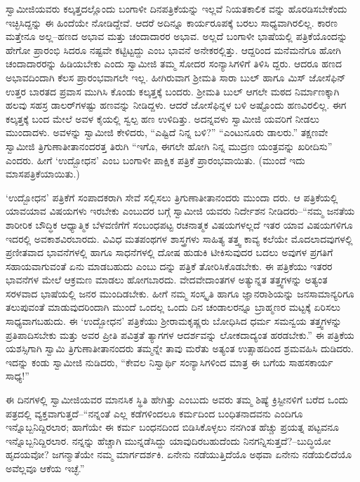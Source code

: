 ಸ್ವಾಮೀಜಿಯವರು ಕಲ್ಕತ್ತದಲ್ಲೊಂದು ಬಂಗಾಳೀ ದಿನಪತ್ರಿಕೆಯನ್ನು ಇಲ್ಲವೆ ನಿಯತಕಾಲಿಕ ವನ್ನು ಹೊರಡಿಸಬೇಕೆಂದು ಇಚ್ಛಿಸಿದ್ದನ್ನು ಈ ಹಿಂದೆಯೇ ನೋಡಿದ್ದೇವೆ. ಆದರೆ ಅದಿನ್ನೂ ಕಾರ್ಯರೂಪಕ್ಕೆ ಬರಲು ಸಾಧ್ಯವಾಗಿರಲಿಲ್ಲ. ಕಾರಣ ಮತ್ತೇನೂ ಅಲ್ಲ–ಹಣದ ಅಭಾವ ಮತ್ತು ಚಂದಾದಾರರ ಅಭಾವ. ಅಲ್ಲದೆ ಬಂಗಾಳೀ ಭಾಷೆಯಲ್ಲಿ ಪತ್ರಿಕೆಯೊಂದನ್ನು ಹೇಗೋ ಪ್ರಾರಂಭಿ ಸಿದರೂ ನಷ್ಟವೇ ಕಟ್ಟಿಟ್ಟದ್ದು ಎಂಬ ಭಾವನೆ ಅನೇಕರಲ್ಲಿತ್ತು. ಆದ್ದರಿಂದ ಮನೆಮನೆಗೂ ಹೋಗಿ ಚಂದಾದಾರರನ್ನು ಹಿಡಿಯಬೇಕು ಎಂದು ಸ್ವಾಮೀಜಿ ತಮ್ಮ ಸೋದರ ಸಂನ್ಯಾಸಿಗಳಿಗೆ ತಿಳಿಸಿ ದ್ದರು. ಆದರೂ ಹಣದ ಅಭಾವದಿಂದಾಗಿ ಕೆಲಸ ಪ್ರಾರಂಭವಾಗಲೇ ಇಲ್ಲ. ಹೀಗಿರುವಾಗ ಶ್ರೀಮತಿ ಸಾರಾ ಬುಲ್ ಹಾಗೂ ಮಿಸ್ ಜೋಸೆಫಿನ್ ಉತ್ತರ ಬಾರತದ ಪ್ರವಾಸ ಮುಗಿಸಿ ಕೊಂಡು ಕಲ್ಕತ್ತಕ್ಕೆ ಬಂದರು. ಶ್ರೀಮತಿ ಬುಲ್ ಆಗಲೇ ಮಠದ ನಿರ್ಮಾಣಕ್ಕಾಗಿ ಹಲವು ಸಹಸ್ರ ಡಾಲರ್​ಗಳಷ್ಟು ಹಣವನ್ನು ನೀಡಿದ್ದಳು. ಆದರೆ ಜೋಸೆಫಿನ್ನಳ ಬಳಿ ಅಷ್ಟೊಂದು ಹಣವಿರಲಿಲ್ಲ. ಈಗ ಕಲ್ಕತ್ತಕ್ಕೆ ಬಂದ ಮೇಲೆ ಅವಳ ಕೈಯಲ್ಲಿ ಸ್ವಲ್ಪ ಹಣ ಉಳಿದಿತ್ತು. ಅದನ್ನವಳು ಸ್ವಾಮೀಜಿ ಯವರಿಗೆ ನೀಡಲು ಮುಂದಾದಳು. ಅವಳನ್ನು ಸ್ವಾಮೀಜಿ ಕೇಳಿದರು, “ಎಷ್ಟಿದೆ ನಿನ್ನ ಬಳಿ?” “ಎಂಟುನೂರು ಡಾಲರು.” ತಕ್ಷಣವೇ ಸ್ವಾಮೀಜಿ ತ್ರಿಗುಣಾತೀತಾನಂದರತ್ತ ತಿರುಗಿ “ಇಗೊ, ಈಗಲೇ ಹೋಗಿ ನಿನ್ನ ಮುದ್ರಣ ಯಂತ್ರವನ್ನು ಖರೀದಿಸು” ಎಂದರು. ಹೀಗೆ ‘ಉದ್ಬೋಧನ’ ಎಂಬ ಬಂಗಾಳೀ ಪಾಕ್ಷಿಕ ಪತ್ರಿಕೆ ಪ್ರಾರಂಭವಾಯಿತು. (ಮುಂದೆ ಇದು ಮಾಸಪತ್ರಿಕೆಯಾಯಿತು.)

‘ಉದ್ಬೋಧನ’ ಪತ್ರಿಕೆಗೆ ಸಂಪಾದಕರಾಗಿ ಸೇವೆ ಸಲ್ಲಿಸಲು ತ್ರಿಗುಣಾತೀತಾನಂದರು ಮುಂದಾ ದರು. ಆ ಪತ್ರಿಕೆಯಲ್ಲಿ ಯಾವಯಾವ ವಿಷಯಗಳು ಇರಬೇಕು ಎಂಬುದರ ಬಗ್ಗೆ ಸ್ವಾಮೀಜಿ ಯವರು ನಿರ್ದೇಶನ ನೀಡಿದರು–“ನಮ್ಮ ಜನತೆಯ ಶಾರೀರಿಕ ಬೌದ್ಧಿಕ ಆಧ್ಯಾತ್ಮಿಕ ಬೆಳವಣಿಗೆಗೆ ಸಂಬಂಧಪಟ್ಟ ರಚನಾತ್ಮಕ ವಿಷಯಗಳಲ್ಲದೆ ಇತರ ಯಾವ ವಿಷಯಗಳಿಗೂ ಇದರಲ್ಲಿ ಅವಕಾಶವಿರಬಾರದು. ವಿವಿಧ ಮತಪಂಥಗಳ ಶಾಸ್ತ್ರಗಳು ಸಾಹಿತ್ಯ ತತ್ತ್ವ ಕಾವ್ಯ ಕಲೆಯೇ ಮೊದಲಾದವುಗಳಲ್ಲಿ ಪ್ರಣೀತವಾದ ಭಾವನೆಗಳಲ್ಲಿ ಹಾಗೂ ಸಾಧನೆಗಳಲ್ಲಿ ದೋಷ ಹುಡುಕಿ ಟೀಕಿಸುವುದರ ಬದಲು ಅವುಗಳ ಪ್ರಗತಿಗೆ ಸಹಾಯವಾಗುವಂತೆ ಏನು ಮಾಡಬಹುದು ಎಂಬು ದನ್ನು ಪತ್ರಿಕೆ ತೋರಿಸಿಕೊಡಬೇಕು. ಈ ಪತ್ರಿಕೆಯು ಇತರರ ಭಾವನೆಗಳ ಮೇಲೆ ಆಕ್ರಮಣ ಮಾಡಲು ಹೋಗಬಾರದು. ವೇದವೇದಾಂತಗಳ ಅತ್ಯುನ್ನತ ತತ್ತ್ವಗಳನ್ನು ಅತ್ಯಂತ ಸರಳವಾದ ಭಾಷೆಯಲ್ಲಿ ಜನರ ಮುಂದಿಡಬೇಕು. ಹೀಗೆ ನಮ್ಮ ಸಂಸ್ಕೃತಿ ಹಾಗೂ ಜ್ಞಾನರಾಶಿಯನ್ನು ಜನಸಾಮಾನ್ಯರಿಗೂ ತಲುಪುವಂತೆ ಮಾಡುವುದರಿಂದಾಗಿ ಮುಂದೆ ಒಂದಲ್ಲ ಒಂದು ದಿನ ಚಂಡಾಲರನ್ನೂ ಬ್ರಾಹ್ಮಣರ ಮಟ್ಟಕ್ಕೆ ಏರಿಸಲು ಸಾಧ್ಯವಾಗಬಹುದು. ಈ ‘ಉದ್ಬೋಧನ’ ಪತ್ರಿಕೆಯು ಶ್ರೀರಾಮಕೃಷ್ಣರು ಬೋಧಿಸಿದ ಧರ್ಮ ಸಮನ್ವಯ ತತ್ತ್ವಗಳನ್ನು ಪ್ರತಿಪಾದಿಸಬೇಕು ಮತ್ತು ಅವರ ಪ್ರೀತಿ ಪವಿತ್ರತೆ ತ್ಯಾಗಗಳ ಆದರ್ಶವನ್ನು ಲೋಕದಾದ್ಯಂತ ಹರಡಬೇಕು.” ಈ ಪತ್ರಿಕೆಯ ಯಶಸ್ಸಿಗಾಗಿ ಸ್ವಾಮಿ ತ್ರಿಗುಣಾತೀತಾನಂದರು ತಮ್ಮನ್ನೇ ತಾವು ಮರೆತು ಅತ್ಯಂತ ಉತ್ಸಾಹದಿಂದ ಶ್ರಮವಹಿಸಿ ದುಡಿದರು. ಇದನ್ನು ಕಂಡು ಸ್ವಾಮೀಜಿ ನುಡಿದರು, “ಕೇವಲ ನಿಸ್ವಾರ್ಥಿ ಸಂನ್ಯಾಸಿಗಳಿಂದ ಮಾತ್ರ ಈ ಬಗೆಯ ಸಾಹಸಕಾರ್ಯ ಸಾಧ್ಯ!”

ಈ ದಿನಗಳಲ್ಲಿ ಸ್ವಾಮೀಜಿಯವರ ಮಾನಸಿಕ ಸ್ಥಿತಿ ಹೇಗಿತ್ತು ಎಂಬುದು ಅವರು ತಮ್ಮ ಶಿಷ್ಯೆ ಕ್ರಿಸ್ಟೀನಳಿಗೆ ಬರೆದ ಒಂದು ಪತ್ರದಲ್ಲಿ ವ್ಯಕ್ತವಾಗುತ್ತದೆ–“ನನ್ನಂತೆ ಎಲ್ಲ ಕಡೆಗಳಿಂದಲೂ ಕರ್ಮದಿಂದ ಬಂಧಿತನಾದವನು ಎಂದಿಗೂ ಇನ್ನೊಬ್ಬನಿದ್ದಿರಲಾರ; ಹಾಗೆಯೇ ಈ ಕರ್ಮ ಬಂಧನದಿಂದ ಬಿಡಿಸಿಕೊಳ್ಳಲು ನನಗಿಂತ ಹೆಚ್ಚು ಪ್ರಯತ್ನ ಪಟ್ಟವನೂ ಇನ್ನೊಬ್ಬನಿದ್ದಿರಲಾರ. ನನ್ನನ್ನು ಹೆಚ್ಚಾಗಿ ಮುನ್ನಡೆಸಿದ್ದು ಯಾವುದಿರಬಹುದೆಂದು ನಿನಗನ್ನಿಸುತ್ತದೆ?–ಬುದ್ಧಿಯೋ ಹೃದಯವೋ? ಜಗನ್ಮಾತೆಯೇ ನಮ್ಮ ಮಾರ್ಗದರ್ಶಕಿ. ಏನೇನು ನಡೆಯುತ್ತಿದೆಯೊ ಅಥವಾ ಏನೇನು ನಡೆಯಲಿದೆಯೊ ಅವೆಲ್ಲವೂ ಆಕೆಯ ಇಚ್ಛೆ.”

